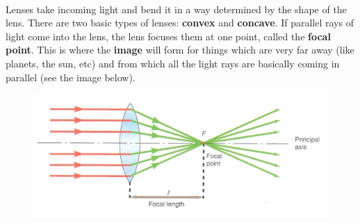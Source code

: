 \documentclass[12pt]{article}%
\begin{document}
\paragraph{}
Lenses take incoming light and bend it in a way determined by the shape of the lens. There are two basic types of lenses: \textbf{convex} and \textbf{concave}. If parallel rays of light come into the lens, the lens focuses them at one point, called the \textbf{focal point}. This is where the \textbf{image} will form for things which are very far away (like planets, the sun, etc) and from which all the light rays are basically coming in parallel (see the image below).
 
\begin{figure}[ht!]
\begin{center}
\includegraphics[scale=.6]{Optics_fig1.png}
\label{fig:refracting}
\end{center}
\end{figure}
 
\end{document}
